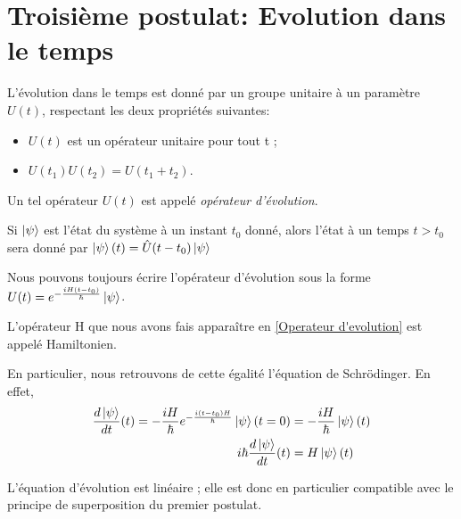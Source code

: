 \documentclass[../notesdecours.tex]{subfiles}
\begin{document}
    \section{Troisième postulat: Evolution dans le temps}

    \begin{definition}
        L'évolution dans le temps est donné par un groupe unitaire à un paramètre $U(t)$, respectant les deux propriétés suivantes:
        \begin{itemize}
            \item $U(t)$ est un opérateur unitaire pour tout t ;
            \item $U(t_1)U(t_2)=U(t_1+t_2)$.
        \end{itemize}
        Un tel opérateur $U(t)$ est appelé \emph{opérateur d'évolution}.
    \end{definition}

    \begin{property}
        Si $\ket{\psi}$ est l'état du système à un instant $t_0$ donné, alors l'état à un temps $t>t_0$ sera donné par 
        \begin{math}
            \ket{\psi}(t) = \hat{U}(t-t_0)\ket{\psi}
        \end{math}
    \end{property}

    \begin{property}
        \label{Operateur d'evolution}
        Nous pouvons toujours écrire l'opérateur d'évolution sous la forme $U(t) = e^{-\frac{iH(t-t_0)}{\hbar}}\ket{\psi}$. 
    \end{property}

    \begin{definition}
        L'opérateur H que nous avons fais apparaître en \ref{Operateur d'evolution} est appelé Hamiltonien. 
    \end{definition}

    En particulier, nous retrouvons de cette égalité l'équation de Schrödinger. En effet,
    \begin{align}
        \frac{d\ket{\psi}}{dt} (t)= -\frac{iH}{\hbar}e^{-\frac{i(t-t_0)H}{\hbar}}\ket{\psi}(t=0) &= -\frac{iH}{\hbar}\ket{\psi}(t)\\
        i\hbar\frac{d\ket{\psi}}{dt} (t) &= H\ket{\psi}(t) \label{Schrodinger}
    \end{align}

    \begin{remark}
        L'équation d'évolution est linéaire ; elle est donc en particulier compatible avec le principe de superposition du premier postulat.
    \end{remark}
\end{document}

